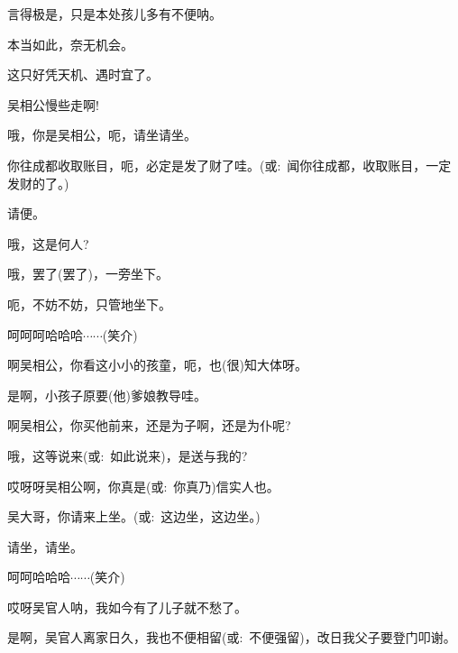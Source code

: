 {{{言得极是，只是本处孩儿多有不便呐。}

{本当如此，奈无机会。}

{这只好凭天机、遇时宜了。}

{吴相公慢些走啊!}


{\vspace{5pt}}


{哦，你是吴相公，呃，请坐请坐。}

{你往成都收取账目，呃，必定是发了财了哇。({\akai 或}:~}闻你往成都，收取账目，一定发财的了。{)}

{请便。}

{哦，这是何人?}

{哦，罢了(罢了)，一旁坐下。}

{呃，不妨不妨，只管地坐下。}

{呵呵呵哈哈哈$\cdots{}\cdots{}$({\hwfs 笑介})}

{啊吴相公，你看这小小的孩童，呃，也(很)知大体呀。}

{是啊，小孩子原要(他)爹娘教导哇。}

{啊吴相公，你买他前来，还是为子啊，还是为仆呢?}

{哦，这等说来({\akai 或}:~}如此说来){，是送与我的?}

{哎呀呀吴相公啊，你真是({\akai 或}:~}你真乃){信实人也。}


{吴大哥，你请来上坐。({\akai 或}:~这边坐，这边坐。)}

{请坐，请坐。}


{呵呵哈哈哈$\cdots{}\cdots{}$({\hwfs 笑介})}

{哎呀吴官人呐，我如今有了儿子就不愁了。}

{是啊，吴官人离家日久，我也不便相留({\akai 或}:~不便强留)，改日我父子要登门叩谢。}

}}
